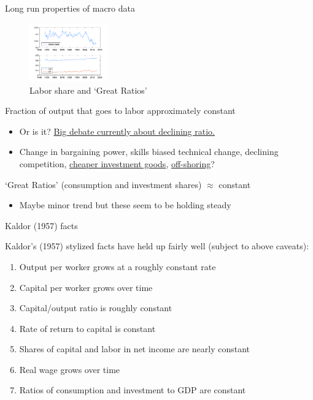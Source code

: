 \begin{frame}{Long run properties of macro data}

\begin{figure}
\caption[Labor share and Great ratios]{Labor share and `Great Ratios'}
\centering
\label{fig:shares_ratios}
\includegraphics[width=0.30\textwidth]{Figures/shares_ratios.JPG}
\end{figure}

Fraction of output that goes to labor approximately constant
	\begin{itemize}
	\item	Or is it? \href{https://blogs.imf.org/2017/04/12/drivers-of-declining-labor-share-of-income/}{Big debate currently about declining ratio.}
	\item	Change in bargaining power, skills biased technical change, declining competition, \href{https://www.nber.org/papers/w19136.pdf}{cheaper investment goods}, \href{https://www.brookings.edu/bpea-articles/the-decline-of-the-u-s-labor-share/}{off-shoring}?
	\end{itemize}
`Great Ratios' (consumption and investment shares) $\approx$ constant
	\begin{itemize}
	\item	Maybe minor trend but these seem to be holding steady
	\end{itemize}

\end{frame}


\begin{frame}{Kaldor (1957) facts}

Kaldor's (1957) stylized facts have held up fairly well (subject to above caveats):
	\begin{enumerate}
	\item Output per worker grows at a roughly constant rate
	\item Capital per worker grows over time
	\item Capital/output ratio is roughly constant
	\item Rate of return to capital is constant
	\item Shares of capital and labor in net income are nearly constant
	\item Real wage grows over time
	\item Ratios of consumption and investment to GDP are constant
	\end{enumerate}

\end{frame}


